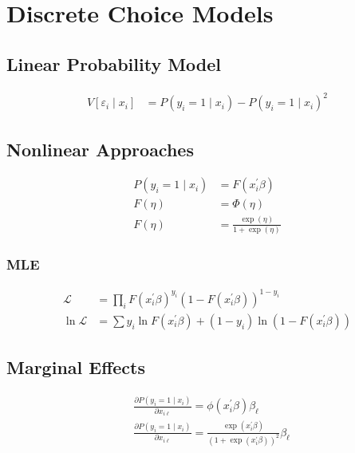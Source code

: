 \section{Discrete Choice Models}

\subsection{Linear Probability Model}

\begin{align*}
    V\left[\varepsilon_i \mid x_i\right] & =P\left(y_i=1 \mid x_i\right)-P\left(y_i=1 \mid x_i\right)^2
\end{align*}

\subsection{Nonlinear Approaches}

\begin{align*}
    P\left(y_i=1 \mid x_i\right) &= F\left(x_i^{\prime} \beta\right) \\
    \tag{Probit}
    F(\eta) &= \Phi(\eta) \\
    \tag{Logit}
    F(\eta) &= \frac{\exp(\eta)}{1+\exp(\eta)}
\end{align*}

\subsubsection{MLE}

\begin{align*}
    \mathcal{L} &= \prod_i F\left(x_i^{\prime} \beta\right)^{y_i}\left(1-F\left(x_i^{\prime} \beta\right)\right)^{1-y_i} \\
    \ln \mathcal{L} &= \sum y_i \ln F\left(x_i^{\prime} \beta\right)+\left(1-y_i\right) \ln \left(1-F\left(x_i^{\prime} \beta\right)\right)
\end{align*}

\subsection{Marginal Effects}

\begin{align}
    \tag{Probit}
    &\frac{\partial P\left(y_i=1 \mid x_i\right)}{\partial x_{i \ell}} = \phi\left(x_i^{\prime} \beta\right) \beta_{\ell} \\
    \tag{Logit}
    &\frac{\partial P\left(y_i=1 \mid x_i\right)}{\partial x_{i \ell}} = \frac{\exp \left(x_i^{\prime} \beta\right)}{\left(1+\exp \left(x_i^{\prime} \beta\right)\right)^2} \beta_{\ell}
\end{align}